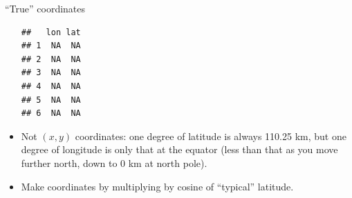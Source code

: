\begin{frame}[fragile]{``True'' coordinates}
\begin{itemize}
\begin{knitrout}
\begin{kframe}
{\ttfamily\noindent{}}\begin{alltt}
\end{alltt}
\begin{verbatim}
##   lon lat
## 1  NA  NA
## 2  NA  NA
## 3  NA  NA
## 4  NA  NA
## 5  NA  NA
## 6  NA  NA
\end{verbatim}
\end{kframe}
\end{knitrout}

  \item Not $(x,y)$ coordinates: one degree of latitude is always
    110.25 km, but one degree of longitude is only that at the equator
    (less than that as you move further north, down to 0 km at north
    pole).
  \item Make coordinates by multiplying by cosine of ``typical'' latitude.
  \end{itemize}
  
\end{frame}

